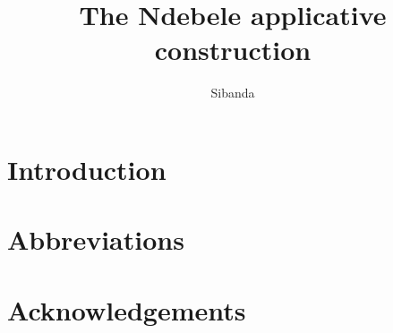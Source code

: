 \documentclass[output=paper]{langsci/langscibook}
\title{The Ndebele applicative construction}
\author{%
 Sibanda \affiliation{} 
}
\begin{document}
\section{Introduction} 

\section*{Abbreviations}
\section*{Acknowledgements}

\printbibliography[heading=subbibliography,notkeyword=this]
\end{document}
